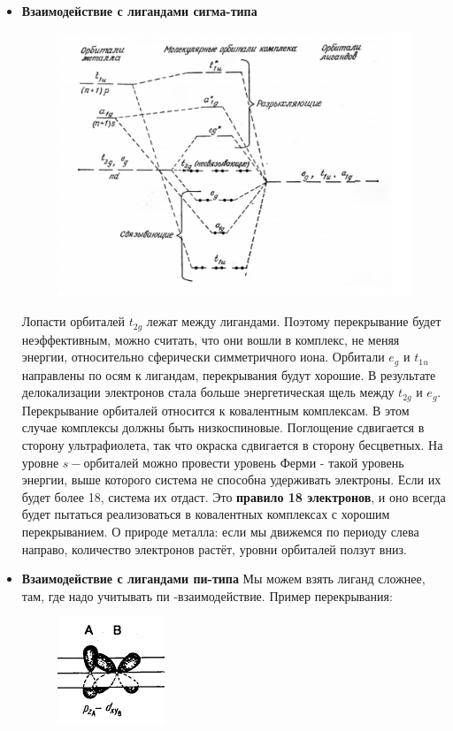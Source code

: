 \begin{itemize}
\item \textbf{Взаимодействие с лигандами сигма-типа}
\begin{figure}[H]
\centering
\includegraphics[scale=1.00]{images/TPL_sigma.png}
\end{figure}
Лопасти орбиталей $t_{2g}$ лежат между лигандами. Поэтому
перекрывание будет неэффективным, можно считать, что
они вошли в комплекс, не меняя энергии, относительно
сферически симметричного иона.
Орбитали $e_g$ и $t_{1u}$ направлены по осям к лигандам,
перекрывания будут хорошие.
В результате делокализации электронов стала больше
энергетическая щель между $t_{2g}$ и $e_g$. Перекрывание
орбиталей относится к ковалентным комплексам. В этом
случае комплексы должны быть низкоспиновые.
Поглощение сдвигается в сторону ультрафиолета, так что
окраска сдвигается в сторону бесцветных.
На уровне $s-$орбиталей можно провести уровень Ферми - такой уровень энергии, выше которого система не способна удерживать электроны. Если их будет более 18, система их отдаст. Это \textbf{правило 18 электронов}, и оно всегда будет пытаться реализоваться в ковалентных комплексах с хорошим перекрыванием.
О природе металла: если мы движемся по периоду слева
направо, количество электронов растёт, уровни орбиталей
ползут вниз.

\item \textbf{Взаимодействие с лигандами пи-типа}
Мы можем взять лиганд сложнее, там, где надо
учитывать пи
-взаимодействие. Пример перекрывания:
\begin{figure}[H]
\centering
\includegraphics[scale=2.00]{images/pi.png}
\end{figure}
\end{itemize}

